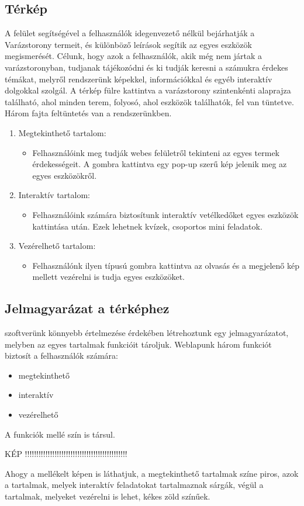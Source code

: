 \documentclass[
]{thesis-ekf}
\theoremstyle{definition}
\theoremstyle{remark}
\begin{document}
		\subsection{Térkép}
			\par A felület segítségével a felhasználók idegenvezető nélkül bejárhatják a Varázstorony termeit, és különböző leírások segítik az egyes eszközök megismerését. Célunk, hogy azok a felhasználók, akik még nem jártak a varázstoronyban, tudjanak tájékozódni és ki tudják keresni a számukra érdekes témákat, melyről rendszerünk képekkel, információkkal és egyéb interaktív dolgokkal szolgál. A térkép fülre kattintva a varázstorony szintenkénti alaprajza található, ahol minden terem, folyosó, ahol eszközök találhatók, fel van tüntetve. Három fajta feltüntetés van a rendszerünkben.
			\par
			\begin{enumerate}
				\item Megtekinthető tartalom:
				\begin{itemize}
					\item Felhasználóink meg tudják webes felületről tekinteni az egyes termek érdekességeit. A gombra kattintva egy pop-up szerű kép jelenik meg az egyes eszközökről.
				\end{itemize}
				\item Interaktív tartalom:
				\begin{itemize}
					\item Felhasználóink számára biztosítunk interaktív vetélkedőket egyes eszközök kattintása után. Ezek lehetnek kvízek, csoportos mini feladatok. 
				\end{itemize}
				\item Vezérelhető tartalom:
				\begin{itemize}
					\item Felhasználónk ilyen típusú gombra kattintva az olvasás és a megjelenő kép mellett vezérelni is tudja egyes eszközöket.
				\end{itemize}
			\end{enumerate}
		\subsection{Jelmagyarázat a térképhez}
			szoftverünk könnyebb értelmezése érdekében létrehoztunk egy jelmagyarázatot, melyben az egyes tartalmak funkcióit tároljuk. Weblapunk három funkciót biztosít a felhasználók számára:
			\begin{itemize}
				\item megtekinthető
				\item interaktív
				\item vezérelhető
			\end{itemize}
			\par A funkciók mellé szín is társul.
			\par KÉP !!!!!!!!!!!!!!!!!!!!!!!!!!!!!!!!!!!!!!!!!!!!!
			\par Ahogy a mellékelt képen is láthatjuk, a megtekinthető tartalmak színe piros, azok a tartalmak, melyek interaktív feladatokat tartalmaznak sárgák, végül a tartalmak, melyeket vezérelni is lehet, kékes zöld színűek.
			
\end{document}
